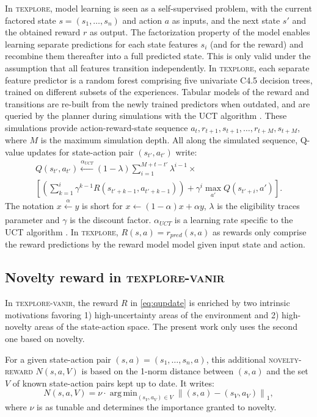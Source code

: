 \documentclass[letterpaper, 10 pt, conference]{ieeeconf}  %
\DeclareMathOperator*{\argmin}{arg\,min}
\newcommand{\norm}[1]{\left\lVert#1\right\rVert_1}
\begin{document}
In \textsc{texplore}, model learning is seen as a self-supervised problem, with the current factored state $s=(s_1, \dots, s_n)$ and action $a$ as inputs, and the next state $s'$ and the obtained reward $r$ as output. The factorization property of the model enables learning separate predictions for each state features $s_i$ (and for the reward) and recombine them thereafter into a full predicted state. This is only valid under the assumption that all features transition independently. In \textsc{texplore}, each separate feature predictor is a random forest comprising five univariate C4.5 decision trees, trained on different subsets of the experiences. Tabular models of the reward and transitions are re-built from the newly trained predictors when outdated, and are queried by the planner during simulations with the UCT algorithm \cite{kocsis_bandit-based_2006}. These simulations provide action-reward-state sequence $a_t, r_{t+1}, s_{t+1}, \dots, r_{t+M}, s_{t+M}$, where $M$ is the maximum simulation depth. All along the simulated sequence, Q-value updates for state-action pair $(s_{t'},a_{t'})$ write: 
\begin{multline}
\label{eq:qupdate}
Q(s_{t'},a_{t'}) \xleftarrow[]{\alpha_{UCT}} (1-\lambda) \sum_{i=1}^{M+t-t'} \lambda^{i-1} \times \\
\left[ \left(\sum_{k=1}^{i} \gamma^{k-1} R(s_{t'+k-1},a_{t'+k-1})\right) + \gamma^{i} \max_{a'} Q(s_{t'+i},a')\right].
\end{multline}
The notation $x \xleftarrow[]{\alpha} y$ is short for $x \leftarrow (1-\alpha)x+\alpha y$, $\lambda$ is the eligibility traces parameter and $\gamma$ is the discount factor. $\alpha_{UCT}$ is a learning rate specific to the UCT algorithm \cite{hester_texplore:_2013}. In \textsc{texplore}, $R(s,a)=r_{pred}(s,a)$ as rewards only comprise the reward predictions by the reward model model given input state and action.

\subsection{Novelty reward in \textsc{texplore-vanir}}

In \textsc{texplore-vanir}, the reward $R$ in \eqref{eq:qupdate} is enriched by two intrinsic motivations favoring 1) high-uncertainty areas of the environment and 2) high-novelty areas of the state-action space. The present work only uses the second one based on novelty.

For a given state-action pair $(s,a)=(s_1,\dots, s_n,a)$, this additional \textsc{novelty-reward} $N(s,a,V)$ is based on the 1-norm distance between $(s,a)$ and the set $V$ of known state-action pairs kept up to date. It writes: 
\begin{equation}
\label{eq:novelty}
N(s,a, V) = \nu \cdot \argmin_{(s_V,a_V) \in V} \norm{(s,a)-(s_V,a_V)},
\end{equation}
where $\nu$ is as tunable and determines the importance granted to novelty. 
\end{document}
